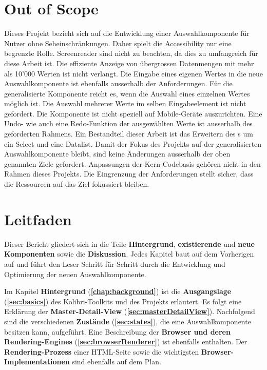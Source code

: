 \section{Out of Scope}
\label{sec:outOfScope}

Dieses Projekt bezieht sich auf die Entwicklung einer Auswahlkomponente für Nutzer ohne Seheinschränkungen. 
Daher spielt die Accessibility nur eine begrenzte Rolle. 
Screenreader sind nicht zu beachten, da dies zu umfangreich für diese Arbeit ist. 
Die effiziente Anzeige von übergrossen Datenmengen mit mehr als 10'000 Werten ist nicht verlangt. 
Die Eingabe eines eigenen Wertes in die neue Auswahlkomponente ist ebenfalls ausserhalb der Anforderungen. 
Für die generalisierte Komponente reicht es, wenn die Auswahl eines einzelnen Wertes möglich ist. 
Die Auswahl mehrerer Werte im selben Eingabeelement ist nicht gefordert. 
Die Komponente ist nicht speziell auf Mobile-Geräte auszurichten. 
Eine Undo- wie auch eine Redo-Funktion der ausgewählten Werte ist ausserhalb des geforderten Rahmens. 
Ein Bestandteil dieser Arbeit ist das Erweitern des s um ein Select und eine Datalist. 
Damit der Fokus des Projekts auf der generalisierten Auswahlkomponente bleibt, sind keine Änderungen ausserhalb der oben genannten Ziele gefordert. 
Anpassungen der Kern-Codebasis gehören nicht in den Rahmen dieses Projekts. 
Die Eingrenzung der Anforderungen stellt sicher, dass die Ressourcen auf das Ziel fokussiert bleiben. 


\section{Leitfaden}
\label{sec:tocTexted}

Dieser Bericht gliedert sich in die Teile \textbf{Hintergrund}, \textbf{existierende} und \textbf{neue Komponenten} sowie die \textbf{Diskussion}. 
Jedes Kapitel baut auf dem Vorherigen auf und führt den Leser Schritt für Schritt durch die Entwicklung und Optimierung der neuen Auswahlkomponente. 

Im Kapitel \textbf{Hintergrund} (\textbf{\ref{chap:background}}) ist die \textbf{Ausgangslage} (\textbf{\ref{sec:basics}}) des Kolibri-Toolkits und des Projekts erläutert. 
Es folgt eine Erklärung der \textbf{Master-Detail-View} (\textbf{\ref{sec:masterDetailView}}). 
Nachfolgend sind die verschiedenen \textbf{Zustände} (\textbf{\ref{sec:states}}), die eine Auswahlkomponente besitzen kann, aufgeführt. 
Eine Beschreibung der \textbf{Browser und deren Rendering-Engines} (\textbf{\ref{sec:browserRenderer}}) ist ebenfalls enthalten. 
Der \textbf{Rendering-Prozess} einer HTML-Seite sowie die wichtigsten \textbf{Browser-Implementationen} sind ebenfalls auf dem Plan. 


